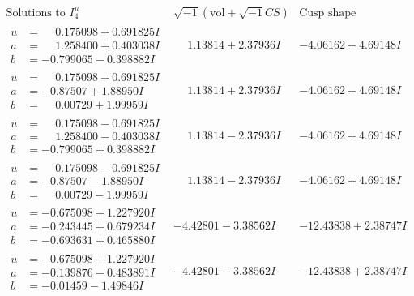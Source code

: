 \documentclass[1p]{elsarticle_modified}
\theoremstyle{definition}
\newcommand{\I}{\sqrt{-1}}
\begin{document}
$$\begin{array}{c|c|c}  
\text{Solutions to }I^u_{4}& \I (\text{vol} + \sqrt{-1}CS) & \text{Cusp shape}\\
 \hline 
\begin{aligned}
u &= \phantom{-}0.175098 + 0.691825 I \\
a &= \phantom{-}1.258400 + 0.403038 I \\
b &= -0.799065 - 0.398882 I\end{aligned}
 & \phantom{-}1.13814 + 2.37936 I & -4.06162 - 4.69148 I \\ \hline\begin{aligned}
u &= \phantom{-}0.175098 + 0.691825 I \\
a &= -0.87507 + 1.88950 I \\
b &= \phantom{-}0.00729 + 1.99959 I\end{aligned}
 & \phantom{-}1.13814 + 2.37936 I & -4.06162 - 4.69148 I \\ \hline\begin{aligned}
u &= \phantom{-}0.175098 - 0.691825 I \\
a &= \phantom{-}1.258400 - 0.403038 I \\
b &= -0.799065 + 0.398882 I\end{aligned}
 & \phantom{-}1.13814 - 2.37936 I & -4.06162 + 4.69148 I \\ \hline\begin{aligned}
u &= \phantom{-}0.175098 - 0.691825 I \\
a &= -0.87507 - 1.88950 I \\
b &= \phantom{-}0.00729 - 1.99959 I\end{aligned}
 & \phantom{-}1.13814 - 2.37936 I & -4.06162 + 4.69148 I \\ \hline\begin{aligned}
u &= -0.675098 + 1.227920 I \\
a &= -0.243445 + 0.679234 I \\
b &= -0.693631 + 0.465880 I\end{aligned}
 & -4.42801 - 3.38562 I & -12.43838 + 2.38747 I \\ \hline\begin{aligned}
u &= -0.675098 + 1.227920 I \\
a &= -0.139876 - 0.483891 I \\
b &= -0.01459 - 1.49846 I\end{aligned}
 & -4.42801 - 3.38562 I & -12.43838 + 2.38747 I \\ \hline\begin{aligned}

\end{aligned}
\end{array}$$
\end{document}
